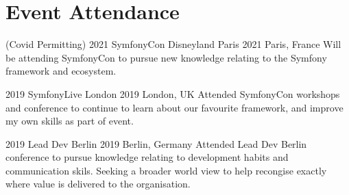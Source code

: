 \documentclass[]{friggeri-cv} %
\begin{document}

%
%
%
%
%
%
%


\section{Event Attendance}

\begin{entrylist}


\entry
{(Covid Permitting) 2021}
{SymfonyCon Disneyland Paris 2021}
{Paris, France}
{Will be attending SymfonyCon to pursue new knowledge relating to the Symfony framework and ecosystem.}



\entry
{2019}
{SymfonyLive London 2019}
{London, UK}
{Attended SymfonyCon workshops and conference to continue to learn about our favourite framework, and improve my own skills as part of event.}


\entry
{2019}
{Lead Dev Berlin 2019}
{Berlin, Germany}
{Attended Lead Dev Berlin conference to pursue knowledge relating to development habits and communication skils.  Seeking a broader world view to help recongise exactly where value is delivered to the organisation.}


\end{entrylist}
\end{document}
